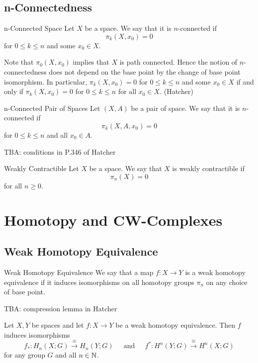 \documentclass[a4paper]{article}
\begin{document}
\subsection{n-Connectedness}
\begin{defn}{n-Connected Space}{} Let $X$ be a space. We say that it is $n$-connected if $$\pi_k(X,x_0)=0$$ for $0\leq k\leq n$ and some $x_0\in X$. 
\end{defn}

Note that $\pi_0(X,x_0)$ implies that $X$ is path connected. Hence the notion of $n$-connectedness does not depend on the base point by the change of base point isomorphism. In particular, $\pi_k(X,x_0)=0$ for $0\leq k\leq n$ and some $x_0\in X$ if and only if $\pi_k(X,x_0)=0$ for $0\leq k\leq n$ for all $x_0\in X$. (Hatcher)

\begin{defn}{n-Connected Pair of Spaces}{} Let $(X,A)$ be a pair of space. We say that it is $n$-connected if $$\pi_k(X,A,x_0)=0$$ for $0\leq k\leq n$ and all $x_0\in A$. 
\end{defn}

TBA: conditions in P.346 of Hatcher

\begin{defn}{Weakly Contractible}{} Let $X$ be a space. We say that $X$ is weakly contractible if $$\pi_n(X)=0$$ for all $n\geq 0$. 
\end{defn}

\pagebreak
\section{Homotopy and CW-Complexes}
\subsection{Weak Homotopy Equivalence}
\begin{defn}{Weak Homotopy Equivalence}{} We say that a map $f:X\to Y$ is a weak homotopy equivalence if it induces isomorphisms on all homotopy groups $\pi_n$ on any choice of base point. 
\end{defn}

TBA: compression lemma in Hatcher

\begin{thm}{}{} Let $X,Y$ be spaces and let $f:X\to Y$ be a weak homotopy equivalence. Then $f$ induces isomorphisms $$f_\ast:H_n(X;G)\overset{\cong}{\longrightarrow}H_n(Y;G)\;\;\;\;\text{ and }\;\;\;\;f^\ast:H^n(Y;G)\overset{\cong}{\longrightarrow}H^n(X;G)$$ for any group $G$ and all $n\in\mathbb{N}$. 
\end{thm}
\end{document}
